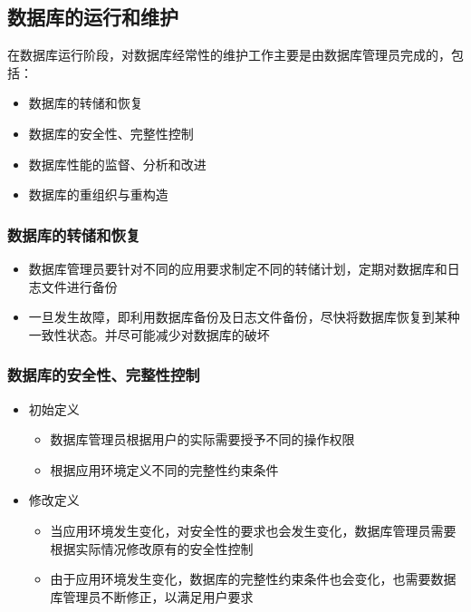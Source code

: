 \subsection{数据库的运行和维护}
在数据库运行阶段，对数据库经常性的维护工作主要是由数据库管理员完成的，包括：
\vspace{-0.8em}
\begin{multicols}{2}
    \begin{itemize}
        \item 数据库的转储和恢复
        \item 数据库的安全性、完整性控制
        \item 数据库性能的监督、分析和改进
        \item 数据库的重组织与重构造
    \end{itemize}
\end{multicols}
\vspace{-1em}

\subsubsection{数据库的转储和恢复}
\begin{itemize}
    \item 数据库管理员要针对不同的应用要求制定不同的转储计划，定期对数据库和日志文件进行备份
    \item 一旦发生故障，即利用数据库备份及日志文件备份，尽快将数据库恢复到某种一致性状态。并尽可能减少对数据库的破坏
\end{itemize}

\subsubsection{数据库的安全性、完整性控制}
\begin{itemize}
    \item 初始定义
    \begin{itemize}
        \item 数据库管理员根据用户的实际需要授予不同的操作权限
        \item 根据应用环境定义不同的完整性约束条件
    \end{itemize}
    \item 修改定义
    \begin{itemize}
        \item 当应用环境发生变化，对安全性的要求也会发生变化，数据库管理员需要根据实际情况修改原有的安全性控制
        \item 由于应用环境发生变化，数据库的完整性约束条件也会变化，也需要数据库管理员不断修正，以满足用户要求
    \end{itemize}
\end{itemize}

